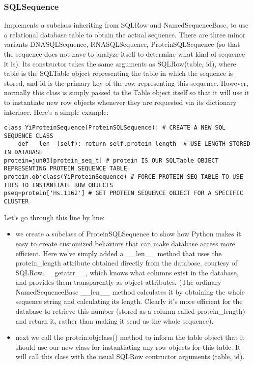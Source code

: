 \documentclass{howto}
\begin{document}
\subsubsection{SQLSequence}

Implements a subclass inheriting from SQLRow and NamedSequenceBase, to use a relational database table to obtain the actual sequence.  There are three minor variants DNASQLSequence, RNASQLSequence, ProteinSQLSequence (so that the sequence does not have to analyze itself to determine what kind of sequence it is).  Its constructor takes the same arguments as SQLRow(table, id), where table is the SQLTable object representing the table in which the sequence is stored, and id is the primary key of the row representing this sequence.  However, normally this class is simply passed to the Table object itself so that it will use it to instantiate new row objects whenever they are requested via its dictionary interface.  Here's a simple example:

\begin{verbatim}
class YiProteinSequence(ProteinSQLSequence): # CREATE A NEW SQL SEQUENCE CLASS
    def __len__(self): return self.protein_length  # USE LENGTH STORED IN DATABASE
protein=jun03[protein_seq_t] # protein IS OUR SQLTable OBJECT REPRESENTING PROTEIN SEQUENCE TABLE
protein.objclass(YiProteinSequence) # FORCE PROTEIN SEQ TABLE TO USE THIS TO INSTANTIATE ROW OBJECTS
pseq=protein['Hs.1162'] # GET PROTEIN SEQUENCE OBJECT FOR A SPECIFIC CLUSTER
\end{verbatim}

Let's go through this line by line:

\begin{itemize}

\item
we create a subclass of ProteinSQLSequence to show how Python makes it easy to create customized behaviors that can make database access more efficient.  Here we've simply added a __len__ method that uses the protein_length attribute obtained directly from the database, courtesy of SQLRow.__getattr__, which knows what columns exist in the database, and provides them transparently as object attributes.  (The ordinary NamedSequenceBase __len__ method calculates it by obtaining the whole sequence string and calculating its length.  Clearly it's more efficient for the database to retrieve this number (stored as a column called protein_length) and return it, rather than making it send us the whole sequence).

\item
next we call the protein.objclass() method to inform the table object that it should use our new class for instantiating any row objects for this table.  It will call this class with the usual SQLRow contructor arguments (table, id).
\end{itemize}
\end{document}
